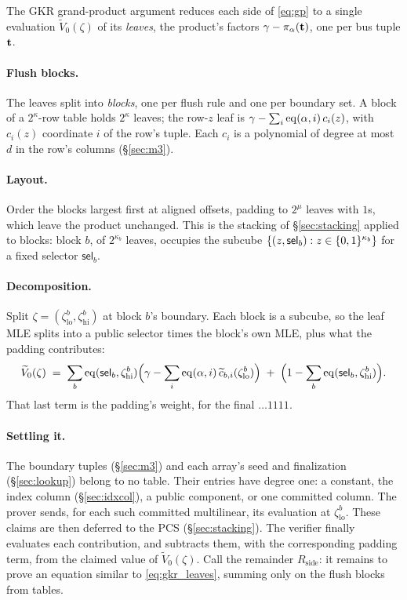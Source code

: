 The GKR grand-product argument reduces each side of \eqref{eq:gp} to a single evaluation $\widetilde V_0(\zeta)$ of its \emph{leaves}, the product's factors $\gamma-\pi_\alpha(\mathbf{t})$, one per bus tuple $\mathbf{t}$.

\paragraph{Flush blocks.} The leaves split into \emph{blocks}, one per flush rule and one per boundary set. A block of a $2^{\kappa}$-row table holds $2^{\kappa}$ leaves; the row-$z$ leaf is $\gamma-\sum_{i}\operatorname{eq}(\alpha,i)\,c_{i}(z)$, with $c_{i}(z)$ coordinate $i$ of the row's tuple. Each $c_i$ is a polynomial of degree at most $d$ in the row's columns (\S\ref{sec:m3}).

\paragraph{Layout.} Order the blocks largest first at aligned offsets, padding to $2^{\mu}$ leaves with $1$s, which leave the product unchanged. This is the stacking of \S\ref{sec:stacking} applied to blocks: block $b$, of $2^{\kappa_b}$ leaves, occupies the subcube $\{(z,\mathsf{sel}_b):z\in\{0,1\}^{\kappa_b}\}$ for a fixed selector $\mathsf{sel}_b$.

\paragraph{Decomposition.} Split $\zeta=(\zeta^{b}_{\mathrm{lo}},\zeta^{b}_{\mathrm{hi}})$ at block $b$'s boundary. Each block is a subcube, so the leaf MLE splits into a public selector times the block's own MLE, plus what the padding contributes:
\begin{equation}\label{eq:gkr_leaves}
  \widetilde V_0(\zeta)\;=\;\sum_b \operatorname{eq}(\mathsf{sel}_b,\zeta^{b}_{\mathrm{hi}})\Bigl(\gamma-\sum_{i}\operatorname{eq}(\alpha,i)\,\widetilde c_{b,i}(\zeta^{b}_{\mathrm{lo}})\Bigr)\;+\;\Bigl(1-\sum_b\operatorname{eq}(\mathsf{sel}_b,\zeta^{b}_{\mathrm{hi}})\Bigr).
\end{equation}
That last term is the padding's weight, for the final $\dots 1111$.

\paragraph{Settling it.} The boundary tuples (\S\ref{sec:m3}) and each array's seed and finalization (\S\ref{sec:lookup}) belong to no table. Their entries have degree one: a constant, the index column (\S\ref{sec:idxcol}), a public component, or one committed column. The prover sends, for each such committed multilinear, its evaluation at $\zeta^{b}_{\mathrm{lo}}$. These claims are then deferred to the PCS (\S\ref{sec:stacking}). The verifier finally evaluates each contribution, and subtracts them, with the corresponding padding term, from the claimed value of $\widetilde V_0(\zeta)$. Call the remainder $R_{\mathrm{side}}$: it remains to prove an equation similar to \eqref{eq:gkr_leaves}, summing only on the flush blocks from tables.

